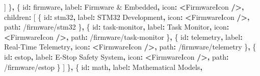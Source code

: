 \documentclass[
]{article}
\newenvironment{Shaded}{\begin{snugshade}}{\end{snugshade}}
\newcommand{\NormalTok}[1]{#1}
\newcommand{\OperatorTok}[1]{\textcolor[rgb]{0.81,0.36,0.00}{\textbf{#1}}}
\newcommand{\StringTok}[1]{\textcolor[rgb]{0.31,0.60,0.02}{#1}}
\begin{document}
\begin{Shaded}
\begin{Highlighting}[]
\NormalTok{    ]}
\NormalTok{  \}}\OperatorTok{,}
\NormalTok{  \{}
\NormalTok{    id}\OperatorTok{:} \StringTok{\textquotesingle{}firmware\textquotesingle{}}\OperatorTok{,}
\NormalTok{    label}\OperatorTok{:} \StringTok{\textquotesingle{}Firmware \& Embedded\textquotesingle{}}\OperatorTok{,}
\NormalTok{    icon}\OperatorTok{:} \OperatorTok{\textless{}}\NormalTok{FirmwareIcon }\OperatorTok{/\textgreater{},}
\NormalTok{    children}\OperatorTok{:}\NormalTok{ [}
\NormalTok{      \{ id}\OperatorTok{:} \StringTok{\textquotesingle{}stm32\textquotesingle{}}\OperatorTok{,}\NormalTok{ label}\OperatorTok{:} \StringTok{\textquotesingle{}STM32 Development\textquotesingle{}}\OperatorTok{,}\NormalTok{ icon}\OperatorTok{:} \OperatorTok{\textless{}}\NormalTok{FirmwareIcon }\OperatorTok{/\textgreater{},}\NormalTok{ path}\OperatorTok{:} \StringTok{\textquotesingle{}/firmware/stm32\textquotesingle{}}\NormalTok{ \}}\OperatorTok{,}
\NormalTok{      \{ id}\OperatorTok{:} \StringTok{\textquotesingle{}task{-}monitor\textquotesingle{}}\OperatorTok{,}\NormalTok{ label}\OperatorTok{:} \StringTok{\textquotesingle{}Task Monitor\textquotesingle{}}\OperatorTok{,}\NormalTok{ icon}\OperatorTok{:} \OperatorTok{\textless{}}\NormalTok{FirmwareIcon }\OperatorTok{/\textgreater{},}\NormalTok{ path}\OperatorTok{:} \StringTok{\textquotesingle{}/firmware/task{-}monitor\textquotesingle{}}\NormalTok{ \}}\OperatorTok{,}
\NormalTok{      \{ id}\OperatorTok{:} \StringTok{\textquotesingle{}telemetry\textquotesingle{}}\OperatorTok{,}\NormalTok{ label}\OperatorTok{:} \StringTok{\textquotesingle{}Real{-}Time Telemetry\textquotesingle{}}\OperatorTok{,}\NormalTok{ icon}\OperatorTok{:} \OperatorTok{\textless{}}\NormalTok{FirmwareIcon }\OperatorTok{/\textgreater{},}\NormalTok{ path}\OperatorTok{:} \StringTok{\textquotesingle{}/firmware/telemetry\textquotesingle{}}\NormalTok{ \}}\OperatorTok{,}
\NormalTok{      \{ id}\OperatorTok{:} \StringTok{\textquotesingle{}estop\textquotesingle{}}\OperatorTok{,}\NormalTok{ label}\OperatorTok{:} \StringTok{\textquotesingle{}E{-}Stop Safety System\textquotesingle{}}\OperatorTok{,}\NormalTok{ icon}\OperatorTok{:} \OperatorTok{\textless{}}\NormalTok{FirmwareIcon }\OperatorTok{/\textgreater{},}\NormalTok{ path}\OperatorTok{:} \StringTok{\textquotesingle{}/firmware/estop\textquotesingle{}}\NormalTok{ \}}
\NormalTok{    ]}
\NormalTok{  \}}\OperatorTok{,}
\NormalTok{  \{}
\NormalTok{    id}\OperatorTok{:} \StringTok{\textquotesingle{}math\textquotesingle{}}\OperatorTok{,}
\NormalTok{    label}\OperatorTok{:} \StringTok{\textquotesingle{}Mathematical Models\textquotesingle{}}\OperatorTok{,}

\end{Highlighting}
\end{Shaded}
\end{document}
